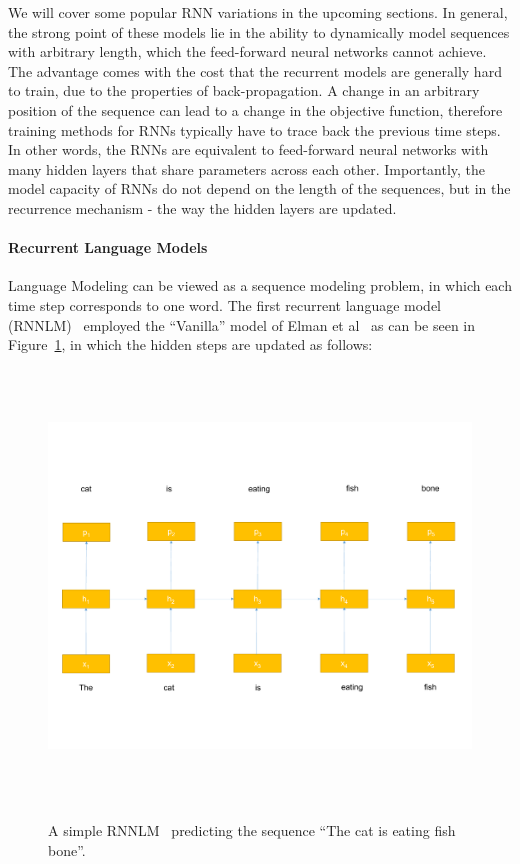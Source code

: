  We will cover some popular RNN variations in the upcoming sections. In general, the strong point of these models lie in the ability to dynamically model sequences with arbitrary length, which the feed-forward neural networks cannot achieve. The advantage comes with the cost that the recurrent models are generally hard to train, due to the properties of back-propagation. A change in an arbitrary position of the sequence can lead to a change in the objective function, therefore training methods for RNNs typically have to trace back the previous time steps. In other words, the RNNs are equivalent to feed-forward neural networks with many hidden layers that share parameters across each other. Importantly, the model capacity of RNNs do not depend on the length of the sequences, but in the recurrence mechanism - the way the hidden layers are updated. 
 
\paragraph{Recurrent Language Models} Language Modeling can be viewed as a sequence modeling problem, in which each time step corresponds to one word. The first recurrent language model (RNNLM)~\cite{mikolov2010recurrent} employed the ``Vanilla'' model of Elman et al~\cite{elman1990finding} as can be seen in Figure~\ref{fig:SimpleRNN}, in which the hidden steps are updated as follows:

~ \begin{figure}[!t]
	~ \centering
	~ \includegraphics[width=\columnwidth]{figures/rnn.pdf}
	~ \caption{A simple RNNLM~\cite{mikolov2010recurrent} predicting the sequence ``The cat is eating fish bone''.}  
	~ \label{fig:SimpleRNN}
	~ \end{figure}


